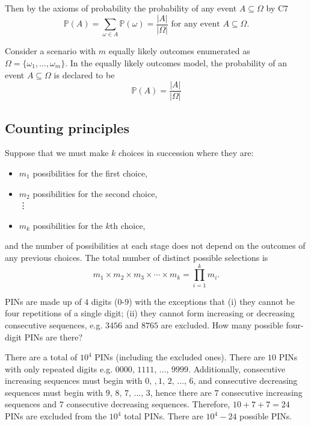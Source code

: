 \documentclass[10pt, a4paper]{article}
\begin{document}
Then by the axioms of probability the probability of any event $A \subseteq \Omega$ by C7
\[
\mathbb{P}(A) = \sum_{\omega \in A}\mathbb{P}(\omega) = \frac{|A|}{|\Omega|}\text{ for any event } A \subseteq \Omega.
\]

\begin{definition}
    Consider a scenario with $m$ equally likely outcomes enumerated as $\Omega = \{\omega_1,\dots,\omega_m\}$. In the equally likely outcomes model, the probability of an event $A \subseteq \Omega$ is declared to be
    \[
    \mathbb{P}(A) = \frac{|A|}{|\Omega|}
    \]
\end{definition}

\subsection{Counting principles}

\begin{countprinc}
    Suppose that we must make $k$ choices in succession where they are:
    \begin{itemize}
        \item $m_1$ possibilities for the first choice,
        \item $m_2$ possibilities for the second choice, \\
        \vdots
        \item $m_k$ possibilities for the $k$th choice,
    \end{itemize}
    and the number of possibilities at each stage does not depend on the outcomes of any previous choices. The total number of distinct possible selections is
    \[
    m_1 \times m_2 \times m_3 \times \dotsi \times m_k = \prod_{i = 1}^{k}m_i.
    \]
\end{countprinc}

\begin{example}
    PINs are made up of $4$ digits ($0$-$9$) with the exceptions that (i) they cannot be four repetitions of a single digit; (ii) they cannot form increasing or decreasing consecutive sequences, e.g. $3456$ and $8765$ are excluded. How many possible four-digit PINs are there?

    There are a total of $10 ^ 4$ PINs (including the excluded ones). There are $10$ PINs with only repeated digits e.g. $0000,\,1111,\,\dotsc,\,9999$. Additionally, consecutive increasing sequences must begin with $0,\,,1,\,2,\,\dotsc,\,6$, and consecutive decreasing sequences must begin with $9,\,8,\,7,\,\dotsc,\,3$, hence there are $7$ consecutive increasing sequences and $7$ consecutive decreasing sequences. Therefore, $10 + 7 + 7 = 24$ PINs are excluded from the $10 ^ 4$ total PINs. There are $10 ^ 4 - 24$ possible PINs. 
\end{example}
\end{document}
